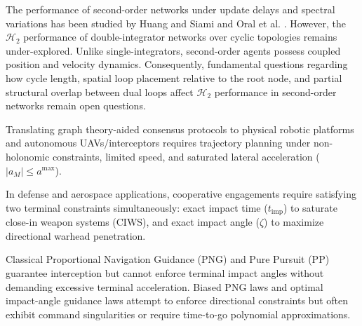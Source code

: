 The performance of second-order networks under update delays and spectral variations has been studied by Huang and Siami \cite{huang2022role} and Oral et al. \cite{oral2017performance}. However, the $\mathcal{H}_2$ performance of double-integrator networks over cyclic topologies remains under-explored. Unlike single-integrators, second-order agents possess coupled position and velocity dynamics. Consequently, fundamental questions regarding how cycle length, spatial loop placement relative to the root node, and partial structural overlap between dual loops affect $\mathcal{H}_2$ performance in second-order networks remain open questions.

Translating graph theory-aided consensus protocols to physical robotic platforms and autonomous UAVs/interceptors requires trajectory planning under non-holonomic constraints, limited speed, and saturated lateral acceleration ($|a_M| \le a^{\text{max}}$).

In defense and aerospace applications, cooperative engagements require satisfying two terminal constraints simultaneously: exact impact time ($t_{\text{imp}}$) to saturate close-in weapon systems (CIWS), and exact impact angle ($\zeta$) to maximize directional warhead penetration. 

Classical Proportional Navigation Guidance (PNG) \cite{SHNEYDOR1998101} and Pure Pursuit (PP) \cite{SHNEYDOR199847} guarantee interception but cannot enforce terminal impact angles without demanding excessive terminal acceleration. Biased PNG laws \cite{kim1998BPNG} and optimal impact-angle guidance laws \cite{Ryoo, ratnoo2009state} attempt to enforce directional constraints but often exhibit command singularities or require time-to-go polynomial approximations.

